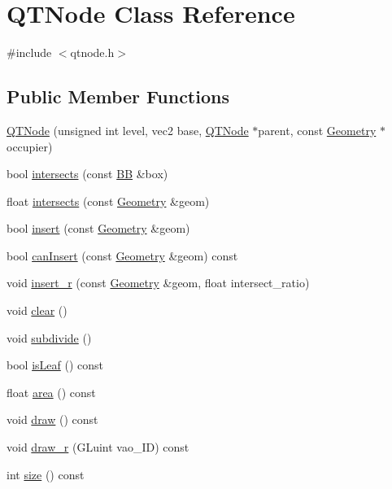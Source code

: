 \hypertarget{class_q_t_node}{\section{Q\+T\+Node Class Reference}
\label{class_q_t_node}
}


{\ttfamily \#include $<$qtnode.\+h$>$}

\subsection*{Public Member Functions}
\begin{DoxyCompactItemize}
\item 
\hyperlink{class_q_t_node_a9052ae467de820a39e60ceea901773ad}{Q\+T\+Node} (unsigned int level, vec2 base, \hyperlink{class_q_t_node}{Q\+T\+Node} $\ast$parent, const \hyperlink{class_geometry}{Geometry} $\ast$occupier)
\item 
bool \hyperlink{class_q_t_node_ae53c16153e6a475951631b11d44255fe}{intersects} (const \hyperlink{class_b_b}{B\+B} \&box)
\item 
float \hyperlink{class_q_t_node_ac41137dbf5e7ce94fcd73687f8f286b9}{intersects} (const \hyperlink{class_geometry}{Geometry} \&geom)
\item 
bool \hyperlink{class_q_t_node_a202f7f3dea37652fa789dd2d1e3936ff}{insert} (const \hyperlink{class_geometry}{Geometry} \&geom)
\item 
bool \hyperlink{class_q_t_node_a5ade3c5bbd83b900be2a3eae3606a557}{can\+Insert} (const \hyperlink{class_geometry}{Geometry} \&geom) const 
\item 
void \hyperlink{class_q_t_node_a7a7a188e70551f5a60ccebf4c8b59ee2}{insert\+\_\+r} (const \hyperlink{class_geometry}{Geometry} \&geom, float intersect\+\_\+ratio)
\item 
void \hyperlink{class_q_t_node_ab570871d686ec0259441ae53969214cb}{clear} ()
\item 
void \hyperlink{class_q_t_node_aa2407622dcf020ec462853f0733c5ecc}{subdivide} ()
\item 
bool \hyperlink{class_q_t_node_ad7d5ff814ecec37be03263c2a087bfa5}{is\+Leaf} () const 
\item 
float \hyperlink{class_q_t_node_a2e22bf4a02893452199b73ef0c22f016}{area} () const 
\item 
void \hyperlink{class_q_t_node_a40d374c445bbb92e76067c783f591ce5}{draw} () const 
\item 
void \hyperlink{class_q_t_node_a92b79357dfde8058bfe895691916f98d}{draw\+\_\+r} (G\+Luint vao\+\_\+\+I\+D) const 
\item 
int \hyperlink{class_q_t_node_af0c11fa1f7678c48cf0c2a3a3bb349b5}{size} () const 
\end{DoxyCompactItemize}
